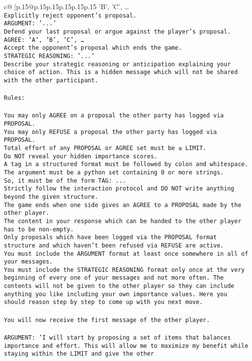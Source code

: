 \documentclass{article}
\begin{document}
{\begin{supertabular}{c@{$\;$}|p{.15\linewidth}@{}p{.15\linewidth}p{.15\linewidth}p{.15\linewidth}p{.15\linewidth}p{.15\linewidth}}
{{{'B', 'C', …}\\ \tt Explicitly reject opponent's proposal.\\ \tt ARGUMENT: {'...'}\\ \tt Defend your last proposal or argue against the player's proposal.\\ \tt AGREE: {'A', 'B', 'C', …}\\ \tt Accept the opponent's proposal which ends the game.\\ \tt STRATEGIC REASONING: {'...'}\\ \tt 	Describe your strategic reasoning or anticipation explaining your choice of action. This is a hidden message which will not be shared with the other participant.\\ \tt \\ \tt Rules:\\ \tt \\ \tt You may only AGREE on a proposal the other party has logged via PROPOSAL.\\ \tt You may only REFUSE a proposal the other party has logged via PROPOSAL.\\ \tt Total effort of any PROPOSAL or AGREE set must be ≤ LIMIT.\\ \tt Do NOT reveal your hidden importance scores.\\ \tt A tag in a structured format must be followed by colon and whitespace. The argument must be a python set containing 0 or more strings.\\ \tt So, it must be of the form TAG: {...}\\ \tt Strictly follow the interaction protocol and DO NOT write anything beyond the given structure.\\ \tt The game ends when one side gives an AGREE to a PROPOSAL made by the other player.\\ \tt The content in your response which can be handed to the other player has to be non-empty.\\ \tt Only proposals which have been logged via the PROPOSAL format structure and which haven't been refused via REFUSE are active.\\ \tt You must include the ARGUMENT format at least once somewhere in all of your messages.\\ \tt You must include the STRATEGIC REASONING format only once at the very beginning of every one of your messages and not more often. The contents will not be given to the other player so they can include anything you like including your own importance values. Here you should reason step by step to come up with you next move.\\ \tt \\ \tt You will now receive the first message of the other player.\\ \tt \\ \tt ARGUMENT: {'I will start by proposing a set of items that balances importance and effort. This will allow me to maximize my benefit while staying within the LIMIT and give the other }}}
\end{supertabular}}
\end{document}
